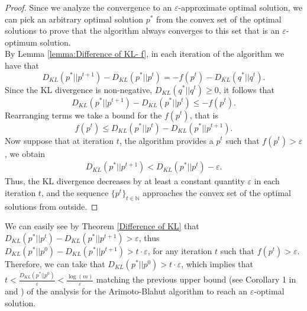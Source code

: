 \documentclass[11pt, letterpaper]{article}
\begin{document}
\begin{proof}
Since we analyze the convergence to an $\varepsilon$-approximate optimal solution, we can pick an arbitrary optimal solution $p^*$ from the convex set of the optimal solutions to prove that the algorithm always converges to this set that is an $\varepsilon$-optimum solution. \\

\noindent By Lemma \ref{lemma:Difference of KL- f}, in each iteration of the algorithm we have that
\begin{equation*}
    D_{KL}(p^*||p^{t+1}) - D_{KL}(p^*||p^{t}) = - f(p^t)- D_{KL}(q^*||q^t).
\end{equation*}
Since the KL divergence is non-negative, $D_{KL}(q^*||q^t) \geq 0$, it follows that
\begin{equation*}
    D_{KL}(p^*||p^{t+1}) - D_{KL}(p^*||p^{t}) \leq - f(p^t).
\end{equation*}
Rearranging terms we take a bound for the $f(p^t)$, that is 
\begin{equation}
\label{bound of f}
f(p^t) \leq D_{KL}(p^*||p^{t}) -D_{KL}(p^*||p^{t+1}).%
\end{equation}
Now suppose that at iteration $t$, the algorithm provides a $p^t$ such that $f(p^t) > \varepsilon$, we obtain
 \begin{equation}
\label{KL inequality}
\begin{split}
    D_{KL}(p^*||p^{t+1}) < D_{KL}(p^*||p^{t}) -\varepsilon.
\end{split}
 \end{equation}
Thus, the KL divergence decreases by at least a constant quantity $\varepsilon$ in each iteration $t$, and the sequence $\{p^t\}_{t \in \mathbb{N}}$ approaches the convex set of the optimal solutions from outside.
\end{proof}

\noindent We can easily see by Theorem \ref{Difference of KL} that $D_{KL}(p^*||p^{t}) - D_{KL}(p^*||p^{t+1}) > \varepsilon$, thus $D_{KL}(p^*||p^{0}) - D_{KL}(p^*||p^{t+1}) > t\cdot \varepsilon$, for any iteration $t$ such that $f(p^t)>\varepsilon$. Therefore, we can take that $D_{KL}(p^*||p^{0})> t\cdot \varepsilon$, which implies that $t < \frac{D_{KL}(p^*||p^{0})}{\varepsilon} < \frac{\log(m)}{\varepsilon}$ matching the previous upper bound (see Corollary 1 in \cite{Arimoto1972AnAF} and \cite{SutterSEL15}) of the analysis for the Arimoto-Blahut algorithm to reach an $\varepsilon$-optimal solution.\\ 
\end{document}
